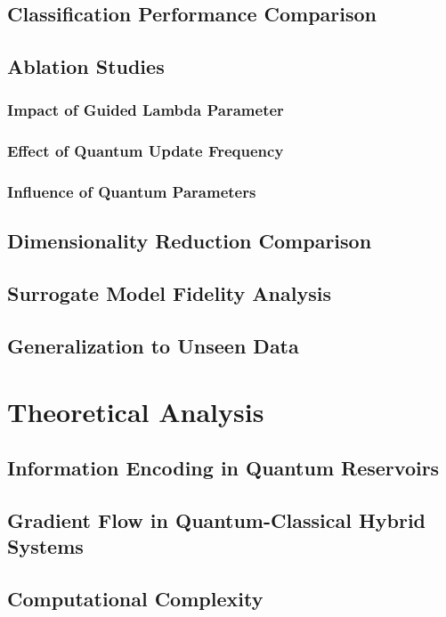 \documentclass[conference]{IEEEtran}
\begin{document}
\subsection{Classification Performance Comparison}
\subsection{Ablation Studies}
\subsubsection{Impact of Guided Lambda Parameter}
\subsubsection{Effect of Quantum Update Frequency}
\subsubsection{Influence of Quantum Parameters}
\subsection{Dimensionality Reduction Comparison}
\subsection{Surrogate Model Fidelity Analysis}
\subsection{Generalization to Unseen Data}

\section{Theoretical Analysis}
\subsection{Information Encoding in Quantum Reservoirs}
\subsection{Gradient Flow in Quantum-Classical Hybrid Systems}
\subsection{Computational Complexity}
\end{document}
